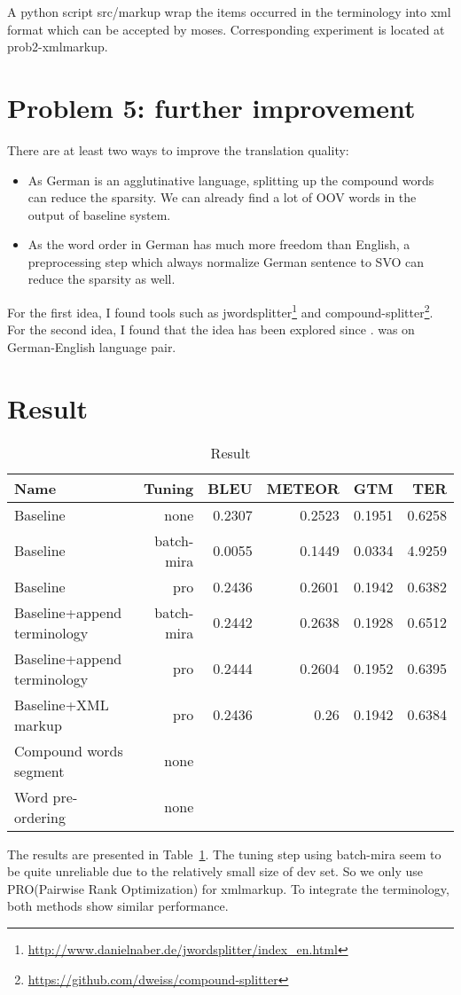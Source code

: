 \documentclass[a4paper]{article}
\begin{document}
A python script src/markup wrap the items occurred in the terminology into xml format which can be accepted by moses.
Corresponding experiment is located at prob2-xmlmarkup.




\section{Problem 5: further improvement}
There are at least two ways to improve the translation quality:
\begin{itemize}
    \item As German is an agglutinative language, splitting up the compound words can reduce the sparsity. We can already find a lot of OOV words in the output of baseline system.
    \item As the word order in German has much more freedom than English, a preprocessing step which always normalize German sentence to SVO can reduce the sparsity as well.
\end{itemize}
For the first idea, I found tools such as jwordsplitter\footnote{\url{http://www.danielnaber.de/jwordsplitter/index_en.html}} and compound-splitter\footnote{\url{https://github.com/dweiss/compound-splitter}}. 
For the second idea, I found that the idea has been explored since \citet{xia2004improving}. \citet{collins2005clause} was on German-English language pair.


\section{Result}
\begin{table}
    \centering
    \begin{tabular}{l|r|r|r|r|r}
        \hline
        Name & Tuning & BLEU & METEOR & GTM & TER \\
        \hline
        Baseline & none& 0.2307 & 0.2523 & 0.1951 & 0.6258 \\
        Baseline & batch-mira & 0.0055 & 0.1449  & 0.0334 & 4.9259 \\
        Baseline & pro & 0.2436 & 0.2601 & 0.1942& 0.6382 \\
        Baseline+append terminology & batch-mira & 0.2442 & 0.2638 & 0.1928 & 0.6512 \\
        Baseline+append terminology & pro & 0.2444 & 0.2604 & 0.1952 & 0.6395 \\
        Baseline+XML markup & pro & 0.2436 & 0.26 &  0.1942 & 0.6384\\
        Compound words segment & none & & & &\\
        Word pre-ordering & none & & & &\\
        \hline
    \end{tabular}
    \caption{Result}
    \label{tab:result}
\end{table}

The results are presented in Table~\ref{tab:result}. 
The tuning step using batch-mira seem to be quite unreliable due to the relatively small size of dev set.
So we only use PRO(Pairwise Rank Optimization) for xmlmarkup.
To integrate the terminology, both methods show similar performance.

\printbibliography
\end{document}
